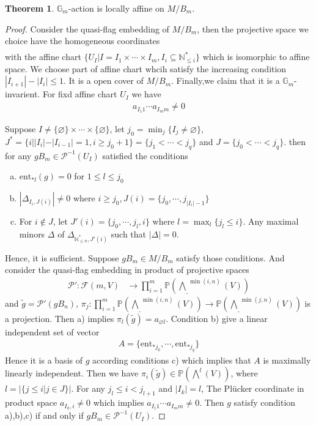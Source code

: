 \documentclass[10pt,UTF8]{article}
\theoremstyle{definition}
\renewcommand{\emptyset}{\varnothing}
\newtheorem{theorem}[definition]{Theorem}
\newtheorem*{proof}{Proof}
\begin{document}
\begin{theorem}
  $\mathbb{G}_m$-action is locally affine on $M/B_m$.
\end{theorem}
\begin{proof}
  Consider the quasi-flag embedding of $M/B_m$, then the projective space we choice have the homogeneous
  coordinates 
  \begin{align*}
    [a_{\emptyset 1}\times\cdots\times a_{\emptyset m}:\cdots:a_{{I_1}1}\times\cdots\times a_{{I_m}m} :\cdots]
  \end{align*} 
  with the affine chart $\{U_I|I=I_1\times \cdots \times I_m,I_i\subseteq \mathbb{N}_{\le i}^* \}$ which is isomorphic to affine space.
  We choose part of affine chart whcih satisfy the increasing condition $|I_{i+1}|-|I_{i}|\le 1$. It is a open cover of $M/B_m$.
  Finally,we claim that it is a $\mathbb{G}_m$-invarient. For fixd affine chart $U_I$ we have
  \begin{align*}
    a_{{I_1}1}\cdots a_{{I_m}m} \neq 0 \tag{$*$}
  \end{align*}

  Suppose $I\not=\{\emptyset\}\times \cdots \times\{\emptyset\}$, let $j_0=\min_{j}\{I_j\neq \emptyset\}$, $J^* = \{i||I_{i}|-|I_{i-1}|=1,i\ge j_0+1\} =\{j_1<\cdots<j_q\}$ and $J=\{j_0<\cdots<j_q\}$.
  then for any $gB_m\in\mathscr{P}^{-1}(U_I)$ 
  satisfied the conditions
  \begin{enumerate}[a)]
    \item $\text{ent}_{*l}(g) = 0 $ for $1\le l\le j_0 $
    \item $|\Delta_{I_i,J(i)}|\neq 0$ where $i\ge j_0,J(i) = \{j_0,\cdots,j_{|I_i|-1}\}$
    \item For $i\notin J$, 
    let $J'(i) = \{j_0,\cdots,j_l,i\}$ where $l=\max_{l}\{j_l\le i\}$.
    Any maximal minors $\Delta$ of $\Delta_{\mathbb{N}^*_{\le n},J'(i)}$ such that $|\Delta|=0$.
  \end{enumerate}

  Hence, it is sufficient. Suppose $gB_m\in M/B_m$ satisfy those conditions.
  And consider the quasi-flag embedding in product of projective spaces
  \begin{align*}
    \mathscr{P}':\mathcal{F}(m,V)&\to  \prod_{i=1}^{m} \mathbb{P}(\underline{\bigwedge}^{\min(i,n)}(V))
  \end{align*}
  and $\tilde{g} = \mathscr{P}'(gB_n)$, $\pi_j:\prod_{i=1}^{m}\mathbb{P}(\underline{\bigwedge}^{\min(i,n)}(V))\to \mathbb{P}(\underline{\bigwedge}^{\min(j,n)}(V))$ is a projection.
  Then a) implies $\pi_{l}(\tilde{g}) = a_{\emptyset l}$. Condition b) give a linear independent set of vector 
  \begin{align*}
    A = \{\text{ent}_{*j_0},\cdots,\text{ent}_{*j_q}\} 
  \end{align*}
Hence it is a basis of $g$ according conditions c) which implies that $A$ is maximally linearly independent.
Then we have  $\pi_i(\tilde{g})\in \mathbb{P}({\bigwedge}^{l}(V))$, where $l=|\{j\le i|j\in J\}|$. For any $j_l \le i< j_{l+1}$ and $|I_k|=l$, 
The Plücker coordinate in product space $a_{I_k,i}\neq 0$ which implies $a_{{I_1}1}\cdots a_{{I_m}m} \neq 0$.
Then $g$ satisfy condition a),b),c) if and only if $gB_m\in\mathscr{P}^{-1}(U_I)$.


\end{proof}
\end{document}
